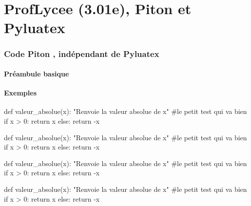 \documentclass[french,a4paper,10pt]{article}
\def\PLver{3.01e}
\begin{document}
\part*{ProfLycee (\PLver), Piton et Pyluatex}

\section{Code \og Piton \fg{}, indépendant de Pyluatex}

\subsection{Préambule basique}

{\small {}}

\subsection{Exemples}

{\small \begin{codehigh}
\begin{CodePiton}{}
def valeur_absolue(x):
    "Renvoie la valeur absolue de x"
    #le petit test qui va bien
    if x > 0:
        return x
    else:
    return -x
\end{CodePiton}
\end{codehigh}}

\begin{CodePiton}{}
def valeur_absolue(x):
	"Renvoie la valeur absolue de x"
	#le petit test qui va bien
	if x > 0:
		return x
	else:
		return -x
\end{CodePiton}

{\small \begin{codehigh}
\begin{CodePiton}[Style=Classique,Largeur=10cm]{}
def valeur_absolue(x):
    "Renvoie la valeur absolue de x"
    #le petit test qui va bien
    if x > 0:
        return x
    else:
    return -x
\end{CodePiton}
\end{codehigh}}

\begin{CodePiton}[Style=Classique,Largeur=10cm]{}
def valeur_absolue(x):
	"Renvoie la valeur absolue de x"
	#le petit test qui va bien
	if x > 0:
		return x
	else:
		return -x
\end{CodePiton}
\end{document}
